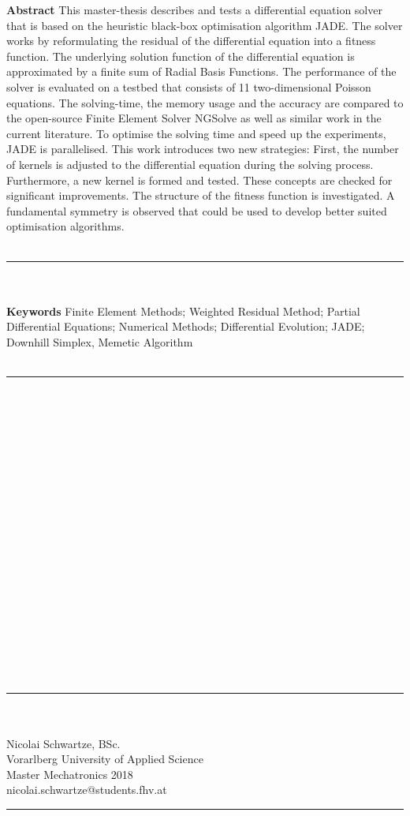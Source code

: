 \documentclass[./\jobname.tex]{subfiles}
\begin{document}
%
\textbf{Abstract} This master-thesis describes and tests a differential equation solver that is based on the heuristic black-box optimisation algorithm JADE. The solver works by reformulating the residual of the differential equation into a fitness function. The underlying solution function of the differential equation is approximated by a finite sum of Radial Basis Functions. The performance of the solver is evaluated on a testbed that consists of 11 two-dimensional Poisson equations. The solving-time, the memory usage and the accuracy are compared to the open-source Finite Element Solver NGSolve as well as similar work in the current literature. To optimise the solving time and speed up the experiments, JADE is parallelised. This work introduces two new strategies: First, the number of kernels is adjusted to the differential equation during the solving process. Furthermore, a new kernel is formed and tested. These concepts are checked for significant improvements. The structure of the fitness function is investigated. A fundamental symmetry is observed that could be used to develop better suited optimisation algorithms. \\~\\
%
\noindent\rule{8.3cm}{0.4pt}

~\\~\\
\textbf{Keywords} Finite Element Methods; Weighted Residual Method; Partial Differential Equations; Numerical Methods; Differential Evolution; JADE; Downhill Simplex, Memetic Algorithm\\~\\

\noindent\rule{8.3cm}{0.4pt}

~\\~\\~\\~\\~\\~\\~\\~\\~\\~\\~\\~\\~\\~\\~\\~\\~\\~\\~\\

\noindent\rule{8.3cm}{0.4pt}

~\\~\\
Nicolai Schwartze, BSc. \\
Vorarlberg University of Applied Science \\
Master Mechatronics 2018 \\
nicolai.schwartze@students.fhv.at \\

\noindent\rule{8.3cm}{0.4pt}


\newpage
\end{document}
